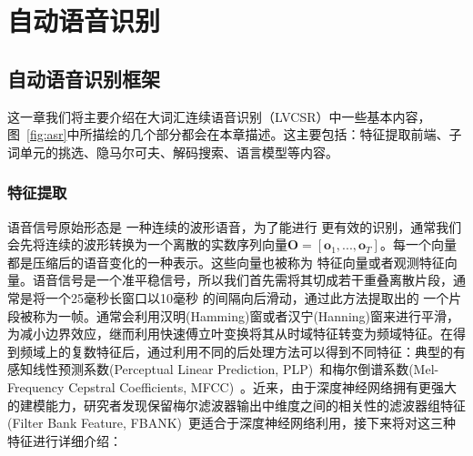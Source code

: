 
\chapter{自动语音识别}
\label{chap:intro}
\section{自动语音识别框架}
\label{chap:intro-asr}


这一章我们将主要介绍在大词汇连续语音识别（LVCSR）中一些基本内容，图~\ref{fig:asr}中所描绘的几个部分都会在本章描述。这主要包括：特征提取前端、子词单元的挑选、隐马尔可夫、解码搜索、语言模型等内容。

\subsection{特征提取}
\label{sec:feat_extra}
语音信号原始形态是  一种连续的波形语音，为了能进行 更有效的识别，通常我们会先将连续的波形转换为一个离散的实数序列向量$\mathbf{O}=\left[ \mathbf{o}_1, ..., \mathbf{o}_T \right]$。每一个向量都是压缩后的语音变化的一种表示。这些向量也被称为 特征向量或者观测特征向量。语音信号是一个准平稳信号，所以我们首先需将其切成若干重叠离散片段，通常是将一个25毫秒长窗口以10毫秒 的间隔向后滑动，通过此方法提取出的 一个片段被称为一帧。通常会利用汉明(Hamming)窗或者汉宁(Hanning)窗来进行平滑，为减小边界效应，继而利用快速傅立叶变换将其从时域特征转变为频域特征。在得到频域上的复数特征后，通过利用不同的后处理方法可以得到不同特征：典型的有感知线性预测系数(Perceptual Linear Prediction, PLP)~\cite{hermansky1990perceptual}和梅尔倒谱系数(Mel-Frequency Cepstral Coefficients, MFCC)~\cite{davis1980comparison}。近来，由于深度神经网络拥有更强大的建模能力，研究者发现保留梅尔滤波器输出中维度之间的相关性的滤波器组特征(Filter Bank Feature, FBANK)~\cite{seide2011feature}更适合于深度神经网络利用，接下来将对这三种特征进行详细介绍：
